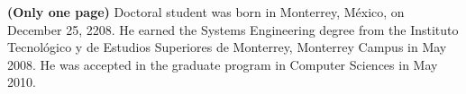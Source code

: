 \textbf{(Only one page)} Doctoral student was born in Monterrey, M\'{e}xico, on December 25, 2208. He earned the Systems Engineering degree from the Instituto Tecnológico y de Estudios Superiores de Monterrey, Monterrey Campus in May 2008. He was accepted in the graduate program in Computer Sciences in May 2010.